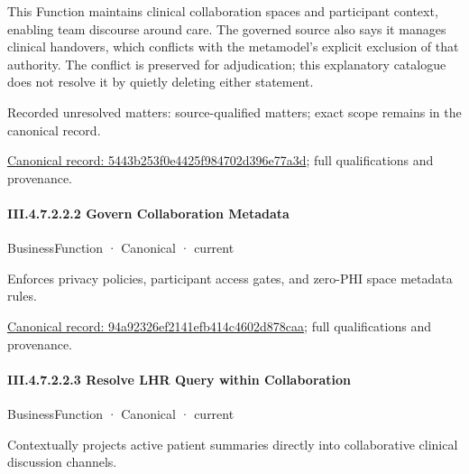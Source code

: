 This Function maintains clinical collaboration spaces and participant context, enabling team discourse around care. The governed source also says it manages clinical handovers, which conflicts with the metamodel's explicit exclusion of that authority. The conflict is preserved for adjudication; this explanatory catalogue does not resolve it by quietly deleting either statement.


{\small Recorded unresolved matters: source-qualified matters; exact scope remains in the canonical record.}\par
{\footnotesize \href{../../../../continuum/business/business-function/5443b253f0e4425f984702d396e77a3d.md}{Canonical record: 5443b253f0e4425f984702d396e77a3d}; full qualifications and provenance.}\par
\paragraph*{III.4.7.2.2.2 Govern Collaboration Metadata}
\label{navigation:III.4.7.2.2.2}

\label{element:94a92326ef2141efb414c4602d878caa}
{\small BusinessFunction · Canonical · current}\par

Enforces privacy policies, participant access gates, and zero-PHI space metadata rules.


{\footnotesize \href{../../../../continuum/business/business-function/94a92326ef2141efb414c4602d878caa.md}{Canonical record: 94a92326ef2141efb414c4602d878caa}; full qualifications and provenance.}\par
\paragraph*{III.4.7.2.2.3 Resolve LHR Query within Collaboration}
\label{navigation:III.4.7.2.2.3}

\label{element:1d4ac561d963484480e6b06a09416616}
{\small BusinessFunction · Canonical · current}\par

Contextually projects active patient summaries directly into collaborative clinical discussion channels.


